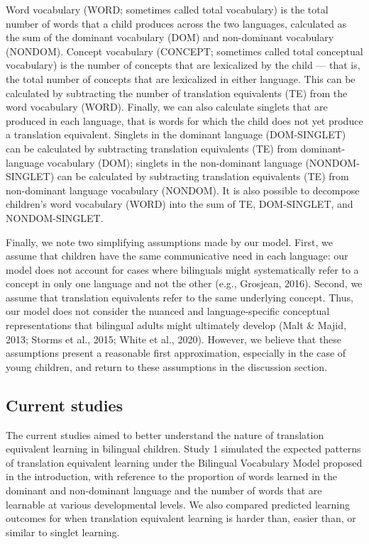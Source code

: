 \documentclass[
  english,
  ,man,floatsintext]{apa6}
\begin{document}
Word vocabulary (WORD; sometimes called total vocabulary) is the total number of words that a child produces across the two languages, calculated as the sum of the dominant vocabulary (DOM) and non-dominant vocabulary (NONDOM). Concept vocabulary (CONCEPT; sometimes called total conceptual vocabulary) is the number of concepts that are lexicalized by the child --- that is, the total number of concepts that are lexicalized in either language. This can be calculated by subtracting the number of translation equivalents (TE) from the word vocabulary (WORD). Finally, we can also calculate singlets that are produced in each language, that is words for which the child does not yet produce a translation equivalent. Singlets in the dominant language (DOM-SINGLET) can be calculated by subtracting translation equivalents (TE) from dominant-language vocabulary (DOM); singlets in the non-dominant language (NONDOM-SINGLET) can be calculated by subtracting translation equivalents (TE) from non-dominant language vocabulary (NONDOM). It is also possible to decompose children's word vocabulary (WORD) into the sum of TE, DOM-SINGLET, and NONDOM-SINGLET.

Finally, we note two simplifying assumptions made by our model. First, we assume that children have the same communicative need in each language: our model does not account for cases where bilinguals might systematically refer to a concept in only one language and not the other (e.g., Grosjean, 2016). Second, we assume that translation equivalents refer to the same underlying concept. Thus, our model does not consider the nuanced and language-specific conceptual representations that bilingual adults might ultimately develop (Malt \& Majid, 2013; Storms et al., 2015; White et al., 2020). However, we believe that these assumptions present a reasonable first approximation, especially in the case of young children, and return to these assumptions in the discussion section.

\hypertarget{current-studies}{%
\subsection{Current studies}\label{current-studies}}

The current studies aimed to better understand the nature of translation equivalent learning in bilingual children. Study 1 simulated the expected patterns of translation equivalent learning under the Bilingual Vocabulary Model proposed in the introduction, with reference to the proportion of words learned in the dominant and non-dominant language and the number of words that are learnable at various developmental levels. We also compared predicted learning outcomes for when translation equivalent learning is harder than, easier than, or similar to singlet learning.
\end{document}
